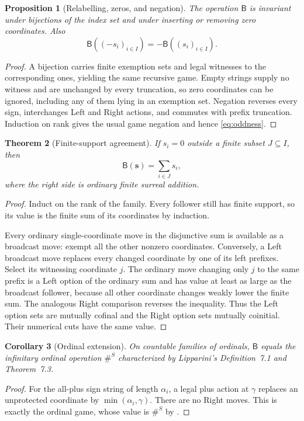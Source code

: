 \documentclass[11pt,letterpaper]{article}
\newtheorem{theorem}{Theorem}[section]
\newtheorem{proposition}[theorem]{Proposition}
\newtheorem{corollary}[theorem]{Corollary}
\theoremstyle{definition}
\theoremstyle{remark}
\newcommand{\BB}{\mathsf B}
\newcommand{\bs}{\boldsymbol{s}}
\begin{document}
\begin{proposition}[Relabelling, zeros, and negation]\label{prop:basic}
The operation $\BB$ is invariant under bijections of the index set and under
inserting or removing zero coordinates. Also
\begin{equation}\label{eq:oddness}
                         \BB((-s_i)_{i\in I})=-\BB((s_i)_{i\in I}).
\end{equation}
\end{proposition}
\begin{proof}
A bijection carries finite exemption sets and legal witnesses to the
corresponding ones, yielding the same recursive game. Empty strings supply no
witness and are unchanged by every truncation, so zero coordinates can be
ignored, including any of them lying in an exemption set. Negation reverses
every sign, interchanges Left and Right actions, and commutes with prefix
truncation. Induction on rank gives the usual game negation and hence
\eqref{eq:oddness}.
\end{proof}

\begin{theorem}[Finite-support agreement]\label{thm:finite-support}
If $s_i=0$ outside a finite subset $J\subseteq I$, then
\begin{equation}\label{eq:finite-support}
                            \BB(\bs)=\sum_{i\in J}s_i,
\end{equation}
where the right side is ordinary finite surreal addition.
\end{theorem}
\begin{proof}
Induct on the rank of the family. Every follower still has finite support, so
its value is the finite sum of its coordinates by induction.

Every ordinary single-coordinate move in the disjunctive sum is available as a
broadcast move: exempt all the other nonzero coordinates. Conversely, a Left
broadcast move replaces every changed coordinate by one of its left prefixes.
Select its witnessing coordinate $j$. The ordinary move changing only $j$ to
the same prefix is a Left option of the ordinary sum and has value at least as
large as the broadcast follower, because all other coordinate changes weakly
lower the finite sum. The analogous Right comparison reverses the inequality.
Thus the Left option sets are mutually cofinal and the Right option sets
mutually coinitial. Their numerical cuts have the same value.
\end{proof}

\begin{corollary}[Ordinal extension]\label{cor:ordinal}
On countable families of ordinals, $\BB$ equals the infinitary ordinal operation
$\#^S$ characterized by Lipparini's Definition~7.1 and Theorem~7.3.
\end{corollary}
\begin{proof}
For the all-plus sign string of length $\alpha_i$, a legal plus action at
$\gamma$ replaces an unprotected coordinate by $\min(\alpha_i,\gamma)$.
There are no Right moves. This is exactly the ordinal game, whose value is
$\#^S$ by \cite[Theorem~7.3]{lipparini2026}.
\end{proof}
\end{document}
